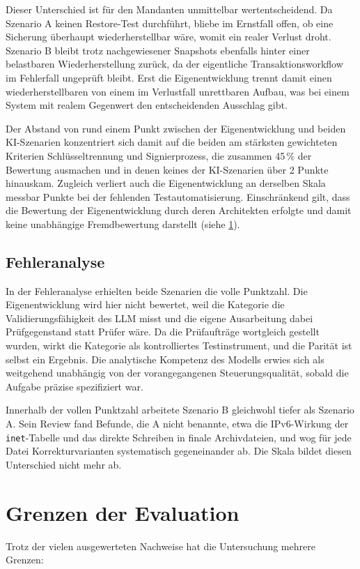 Dieser Unterschied ist für den Mandanten unmittelbar wertentscheidend. Da Szenario A keinen Restore-Test durchführt, bliebe im Ernstfall offen, ob eine Sicherung überhaupt wiederherstellbar wäre, womit ein realer Verlust droht. Szenario B bleibt trotz nachgewiesener Snapshots ebenfalls hinter einer belastbaren Wiederherstellung zurück, da der eigentliche Transaktionsworkflow im Fehlerfall ungeprüft bleibt. Erst die Eigenentwicklung trennt damit einen wiederherstellbaren von einem im Verlustfall unrettbaren Aufbau, was bei einem System mit realem Gegenwert den entscheidenden Ausschlag gibt.

Der Abstand von rund einem Punkt zwischen der Eigenentwicklung und beiden \ac{KI}-Szenarien konzentriert sich damit auf die beiden am stärksten gewichteten Kriterien Schlüsseltrennung und Signierprozess, die zusammen 45\,\% der Bewertung ausmachen und in denen keines der \ac{KI}-Szenarien über 2 Punkte hinauskam. Zugleich verliert auch die Eigenentwicklung an derselben Skala messbar Punkte bei der fehlenden Testautomatisierung. Einschränkend gilt, dass die Bewertung der Eigenentwicklung durch deren Architekten erfolgte und damit keine unabhängige Fremdbewertung darstellt (siehe \ref{sec:grenzen_eval}).\cite{NixOsHot_github,Krypto_Basis_github,NixOsCold_github}

\subsection{Fehleranalyse}
In der Fehleranalyse erhielten beide Szenarien die volle Punktzahl. Die Eigenentwicklung wird hier nicht bewertet, weil die Kategorie die Validierungsfähigkeit des \ac{LLM} misst und die eigene Ausarbeitung dabei Prüfgegenstand statt Prüfer wäre. 
Da die Prüfaufträge wortgleich gestellt wurden, wirkt die Kategorie als kontrolliertes Testinstrument, und die Parität ist selbst ein Ergebnis. Die analytische Kompetenz des Modells erwies sich als weitgehend unabhängig von der vorangegangenen Steuerungsqualität, sobald die Aufgabe präzise spezifiziert war. 

Innerhalb der vollen Punktzahl arbeitete Szenario B gleichwohl tiefer als Szenario A. Sein Review fand Befunde, die A nicht benannte, etwa die \ac{IP}v6-Wirkung der \texttt{inet}-Tabelle und das direkte Schreiben in finale Archivdateien, und wog für jede Datei Korrekturvarianten systematisch gegeneinander ab. 
Die Skala bildet diesen Unterschied nicht mehr ab.\cite{artefaktpruefungA,artefaktreviewB}

\section{Grenzen der Evaluation} \label{sec:grenzen_eval}
Trotz der vielen ausgewerteten Nachweise hat die Untersuchung mehrere Grenzen:

